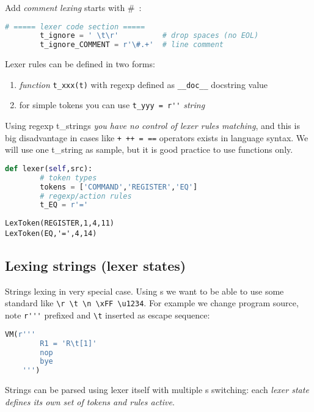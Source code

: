 Add \emph{comment lexing} starts with \#\ : \label{lexcomment}
\begin{lstlisting}[language=python]
		# ===== lexer code section =====
		t_ignore = ' \t\r'			# drop spaces (no EOL)
		t_ignore_COMMENT = r'\#.+'	# line comment
\end{lstlisting}

\clearpage
Lexer rules can be defined in two forms:
\begin{enumerate}[nosep]
  \item \emph{function} \verb|t_xxx(t)| with regexp defined as \verb|__doc__|
  docstring value
  \item for simple tokens you can use \verb|t_yyy = r''| \emph{string}
\end{enumerate}

Using regexp t\_strings \emph{you have no control of lexer rules matching}, and
this is big disadvantage in cases like \verb|+ ++ = ==| operators exists in
language syntax. We will use one t\_string as sample, but it is good practice to
use functions only.
\begin{lstlisting}[language=python]
	def lexer(self,src):
		# token types
		tokens = ['COMMAND','REGISTER','EQ']
		# regexp/action rules
		t_EQ = r'='
\end{lstlisting}
\begin{lstlisting}
LexToken(REGISTER,1,4,11)
LexToken(EQ,'=',4,14)
\end{lstlisting}

\subsection{Lexing strings (lexer states)}\label{lexstring}

Strings lexing in very special case. Using s we want to be
able to use some standard  like
\verb|\r \t \n \xFF \u1234|. For example we change program source, note
\verb|r'''| prefixed and \verb|\t| inserted
as escape sequence:
\begin{lstlisting}[language=python]
	VM(r'''
        R1 = 'R\t[1]'
        nop
        bye
	''')
\end{lstlisting}
Strings can be parsed using lexer itself with multiple s
switching: each \emph{lexer state defines its own set of tokens and rules
active}.

